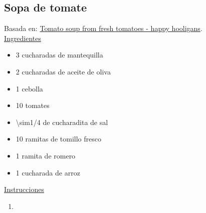 \subsection{Sopa de tomate}

Basada en: \href{https://happyhooligans.ca/best-homemade-tomato-soup-recipe/}{Tomato soup from fresh tomatoes - happy hooligans}. \\

\underline{Ingredientes}

\begin{itemize}
\item 3 cucharadas de mantequilla
\item 2 cucharadas de aceite de oliva 
\item 1 cebolla
\item 10 tomates
\item \num{\sim1/4} de cucharadita de sal 
\item 10 ramitas de tomillo fresco
\item 1 ramita de romero
\item 1 cucharada de arroz
\end{itemize}

\underline{Instrucciones}

\begin{enumerate}
\item 
\end{enumerate}
